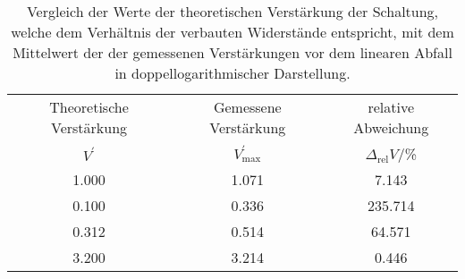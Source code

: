 \begin{table}[!h]
	\centering
	\begin{tabular}{ccc}
		\toprule
		Theoretische Verstärkung & Gemessene Verstärkung & relative Abweichung\\
		$V^{\prime}$ & $V^{\prime}_{\mathrm{max}}$ & $\Delta_{\mathrm{rel}} 
		V$/\si{\percent}\\
\midrule
		\num{1.000} & \num{1.071} & \num{7.143}\\
		\num{0.100} & \num{0.336} & \num{235.714}\\
		\num{0.312} & \num{0.514} & \num{64.571}\\
		\num{3.200} & \num{3.214} & \num{0.446}\\
		\bottomrule
	\end{tabular}
	\caption{ Vergleich der Werte der theoretischen Verstärkung der Schaltung, welche dem Verhältnis der verbauten 
Widerstände entspricht, mit dem Mittelwert der der gemessenen Verstärkungen vor dem linearen Abfall in doppellogarithmischer Darstellung. \label{tab:gegengekoppelter_verstaerker_max_verstaerkung}}
\end{table}
